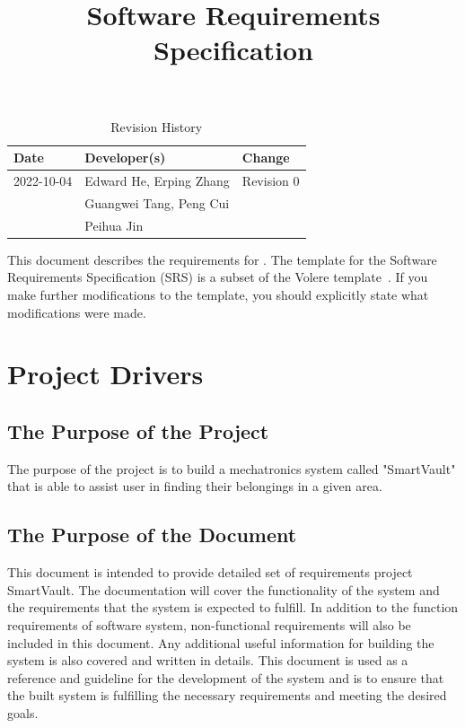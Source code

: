 \documentclass[12pt]{article}
\title{Software Requirements Specification\\\progname}
\author{\authname}
\date{}
\begin{document}
\maketitle

\newpage
{}

\tableofcontents

\newpage

\begin{table}[hp]
\caption{Revision History} \label{TblRevisionHistory}
\begin{tabularx}{\textwidth}{llX}
\toprule
\textbf{Date} & \textbf{Developer(s)} & \textbf{Change}\\
\midrule
2022-10-04 & Edward He, Erping Zhang & Revision 0\\
& Guangwei Tang, Peng Cui & \\
& Peihua Jin & \\
\bottomrule
\end{tabularx}
\end{table}

\newpage

\listoftables
\listoffigures

\newpage


This document describes the requirements for \progname. The template for the Software
Requirements Specification (SRS) is a subset of the Volere
template~\cite{RobertsonAndRobertson2012}. If you make further modifications
to the template, you should explicitly state what modifications were made.

\begin{table}

\end{table}

\section{Project Drivers}

\subsection{The Purpose of the Project}
The purpose of the project is to build a mechatronics system called "SmartVault" that is able to assist user in finding their belongings in a given area. 
\subsection{The Purpose of the Document}
This document is intended to provide detailed set of requirements project SmartVault. The documentation will cover the functionality of the system and the requirements that the system is expected to fulfill. In addition to the function requirements of software system, non-functional requirements will also be included in this document. Any additional useful information for building the system is also covered and written in details. This document is used as a reference and guideline for the development of the system and is to ensure that the built system is fulfilling the necessary requirements and meeting the desired goals.
\end{document}
